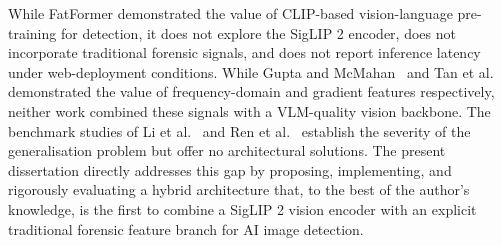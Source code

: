 While FatFormer \cite{liu2024fatformer} demonstrated the value of CLIP-based vision-language pre-training for detection, it does not explore the SigLIP 2 encoder, does not incorporate traditional forensic signals, and does not report inference latency under web-deployment conditions. While Gupta and McMahan~\cite{gupta2025fft} and Tan et al.~\cite{tan2023gradients} demonstrated the value of frequency-domain and gradient features respectively, neither work combined these signals with a VLM-quality vision backbone. The benchmark studies of Li et al.~\cite{li2025aigibench} and Ren et al.~\cite{ren2026benchmark} establish the severity of the generalisation problem but offer no architectural solutions. The present dissertation directly addresses this gap by proposing, implementing, and rigorously evaluating a hybrid architecture that, to the best of the author's knowledge, is the first to combine a SigLIP 2 vision encoder with an explicit traditional forensic feature branch for AI image detection.
